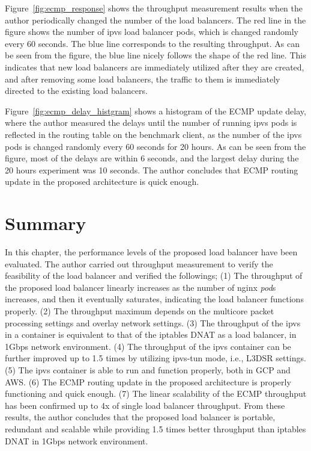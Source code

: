 Figure~\ref{fig:ecmp_response} shows the throughput measurement results when the author periodically changed the number of the load balancers. 
The red line in the figure shows the number of ipvs load balancer pods, which is changed randomly every 60 seconds.
The blue line corresponds to the resulting throughput.
As can be seen from the figure, the blue line nicely follows the shape of the red line.
This indicates that new load balancers are immediately utilized after they are created, and after removing some load balancers, the traffic to them is immediately directed to the existing load balancers.

Figure~\ref{fig:ecmp_delay_histgram} shows a histogram of the ECMP update delay, where the author measured the delays until the number of running ipvs pods is reflected in the routing table on the benchmark client, as the number of the ipvs pods is changed randomly every 60 seconds for 20 hours.
As can be seen from the figure, most of the delays are within 6 seconds, and the largest delay during the 20 hours experiment was 10 seconds.
The author concludes that ECMP routing update in the proposed architecture is quick enough.

\FloatBarrier

\section{Summary}\label{Conclusions}

In this chapter, the performance levels of the proposed load balancer have been evaluated. 
The author carried out throughput measurement to verify the feasibility of the load balancer and verified the followings;
(1) The throughput of the proposed load balancer linearly increases as the number of nginx {\em pod}s increases, and then it eventually saturates, indicating the load balancer functions properly.
(2) The throughput maximum depends on the multicore packet processing settings and overlay network settings.
%
(3) The throughput of the ipvs in a container is equivalent to that of the iptables DNAT as a load balancer, in 1Gbps network environment.
(4) The throughput of the ipvs container can be further improved up to 1.5 times by utilizing ipvs-tun mode, i.e., L3DSR settings.
(5) The ipvs container is able to run and function properly, both in GCP and AWS.
(6) The ECMP routing update in the proposed architecture is properly functioning and quick enough.
(7) The linear scalability of the ECMP throughput has been confirmed up to 4x of single load balancer throughput.
From these results, the author concludes that the proposed load balancer is portable, redundant and scalable while providing 1.5 times better throughput than iptables DNAT in 1Gbps network environment.
